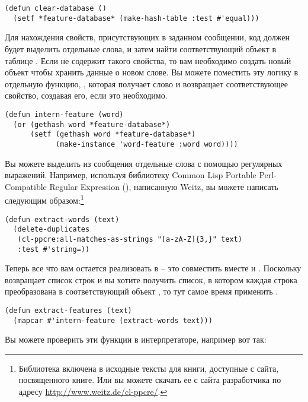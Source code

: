 \begin{lstlisting}
(defun clear-database ()
  (setf *feature-database* (make-hash-table :test #'equal)))
\end{lstlisting}

Для нахождения свойств, присутствующих в заданном сообщении, код должен будет выделить
отдельные слова, и затем найти соответствующий объект  в таблице
.  Если  не содержит такого свойства, то вам
необходимо создать новый объект  чтобы хранить данные о новом слове.  Вы
можете поместить эту логику в отдельную функцию, , которая получает
слово и возвращает соответствующее свойство, создавая его, если это необходимо.

\begin{lstlisting}
(defun intern-feature (word)
  (or (gethash word *feature-database*)
      (setf (gethash word *feature-database*)
            (make-instance 'word-feature :word word))))
\end{lstlisting}

Вы можете выделить из сообщения отдельные слова с помощью регулярных выражений.  Например,
используя библиотеку Common Lisp Portable Perl-Compatible Regular Expression
(), написанную Weitz, вы можете написать  следующим
образом:\footnote{Библиотека  включена в исходные тексты для книги,
  доступные с сайта, посвященного книге.  Или вы можете скачать ее с сайта разработчика по
  адресу \url{http://www.weitz.de/cl-ppcre/}.}

\begin{lstlisting}
(defun extract-words (text)
  (delete-duplicates
   (cl-ppcre:all-matches-as-strings "[a-zA-Z]{3,}" text)
   :test #'string=))
\end{lstlisting}

Теперь все что вам остается реализовать в  -- это совместить вместе
 и .  Поскольку  возвращает
список строк и вы хотите получить список, в котором каждая строка преобразована в
соответствующий объект , то тут самое время применить .

\begin{lstlisting}
(defun extract-features (text)
  (mapcar #'intern-feature (extract-words text)))
\end{lstlisting}

Вы можете проверить эти функции в интерпретаторе, например вот так:

